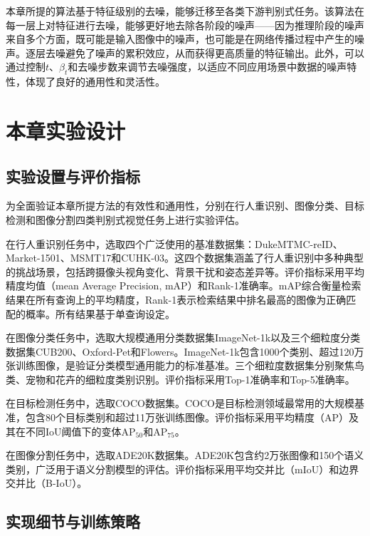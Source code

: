 本章所提的算法基于特征级别的去噪，能够迁移至各类下游判别式任务。该算法在每一层上对特征进行去噪，能够更好地去除各阶段的噪声——因为推理阶段的噪声来自多个方面，既可能是输入图像中的噪声，也可能是在网络传播过程中产生的噪声。逐层去噪避免了噪声的累积效应，从而获得更高质量的特征输出。此外，可以通过控制$t$、$\beta_t$和去噪步数来调节去噪强度，以适应不同应用场景中数据的噪声特性，体现了良好的通用性和灵活性。

\section{本章实验设计}
\label{sec:chap3_exp_setup}

\subsection{实验设置与评价指标}

为全面验证本章所提方法的有效性和通用性，分别在行人重识别、图像分类、目标检测和图像分割四类判别式视觉任务上进行实验评估。

在行人重识别任务中，选取四个广泛使用的基准数据集：DukeMTMC-reID\cite{zheng2017unlabeled}、Market-1501\cite{zheng2015scalable}、MSMT17\cite{wei2018person}和CUHK-03\cite{li2014deepreid}。这四个数据集涵盖了行人重识别中多种典型的挑战场景，包括跨摄像头视角变化、背景干扰和姿态差异等。评价指标采用平均精度均值（mean Average Precision, mAP）和Rank-1准确率。mAP综合衡量检索结果在所有查询上的平均精度，Rank-1表示检索结果中排名最高的图像为正确匹配的概率。所有结果基于单查询设定。

在图像分类任务中，选取大规模通用分类数据集ImageNet-1k\cite{deng2009imagenet}以及三个细粒度分类数据集CUB200\cite{wah2011caltech}、Oxford-Pet\cite{parkhi2012cats}和Flowers\cite{nilsback2008automated}。ImageNet-1k包含1000个类别、超过120万张训练图像，是验证分类模型通用能力的标准基准。三个细粒度数据集分别聚焦鸟类、宠物和花卉的细粒度类别识别。评价指标采用Top-1准确率和Top-5准确率。

在目标检测任务中，选取COCO\cite{lin2014microsoft}数据集。COCO是目标检测领域最常用的大规模基准，包含80个目标类别和超过11万张训练图像。评价指标采用平均精度（AP）及其在不同IoU阈值下的变体AP$_{50}$和AP$_{75}$。

在图像分割任务中，选取ADE20K\cite{zhou2017scene}数据集。ADE20K包含约2万张图像和150个语义类别，广泛用于语义分割模型的评估。评价指标采用平均交并比（mIoU）和边界交并比（B-IoU）。

\subsection{实现细节与训练策略}

